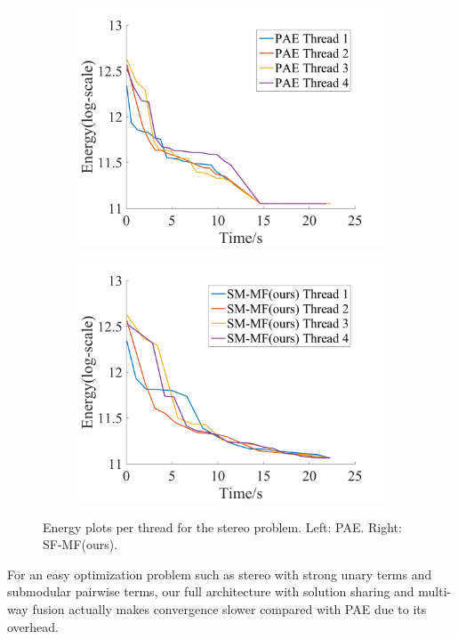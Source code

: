 \begin{figure}[!h]
\centering
\begin{subfigure}{0.49\textwidth}
\includegraphics[width=\textwidth]{figure/stereo_thread_pae.png}
\end{subfigure}
\begin{subfigure}{0.49\textwidth}
\includegraphics[width=\textwidth]{figure/stereo_thread_sf.png}
\end{subfigure}
\caption{Energy plots per thread for the stereo problem. Left: PAE. Right: SF-MF(ours).}
\label{fig:stereo_threads}
\end{figure}

For an easy optimization problem such as stereo with strong unary
terms and submodular pairwise terms, our full architecture with
solution sharing and multi-way fusion actually makes convergence
slower compared with PAE due to its overhead.




